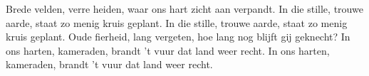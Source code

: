 \beginverse*
Brede velden, verre heiden,
waar ons hart zicht aan verpandt.
In die stille, trouwe aarde,
staat zo menig kruis geplant.
In die stille, trouwe aarde,
staat zo menig kruis geplant.
\endverse
\beginverse*
Oude fierheid, lang vergeten,
hoe lang nog blijft gij geknecht?
In ons harten, kameraden,
brandt 't vuur dat land weer recht.
In ons harten, kameraden,
brandt 't vuur dat land weer recht.
\endverse
\endsong